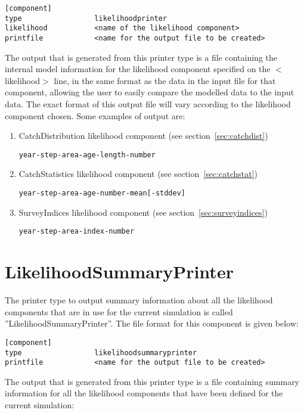 \documentclass[10pt,twoside]{book}
\begin{document}
{\small\begin{verbatim}
[component]
type                 likelihoodprinter
likelihood           <name of the likelihood component>
printfile            <name for the output file to be created>
\end{verbatim}}

The output that is generated from this printer type is a file containing the internal model information for the likelihood component specified on the $<$likelihood$>$ line, in the same format as the data in the input file for that component, allowing the user to easily compare the modelled data to the input data.  The exact format of this output file will vary according to the likelihood component chosen.  Some examples of output are:

\begin{enumerate}
\item CatchDistribution likelihood component (see section~\ref{sec:catchdist})
{\small\begin{verbatim}
year-step-area-age-length-number
\end{verbatim}}
\item CatchStatistics likelihood component (see section~\ref{sec:catchstat})
{\small\begin{verbatim}
year-step-area-age-number-mean[-stddev]
\end{verbatim}}
\item SurveyIndices likelihood component (see section~\ref{sec:surveyindices})
{\small\begin{verbatim}
year-step-area-index-number
\end{verbatim}}
\end{enumerate}

\section{LikelihoodSummaryPrinter}\label{sec:likelihoodsummaryprinter}
The printer type to output summary information about all the likelihood components that are in use for the current simulation is called ''LikelihoodSummaryPrinter''.  The file format for this component is given below:

{\small\begin{verbatim}
[component]
type                 likelihoodsummaryprinter
printfile            <name for the output file to be created>
\end{verbatim}}

The output that is generated from this printer type is a file containing summary information for all the likelihood components that have been defined for the current simulation:
\end{document}

